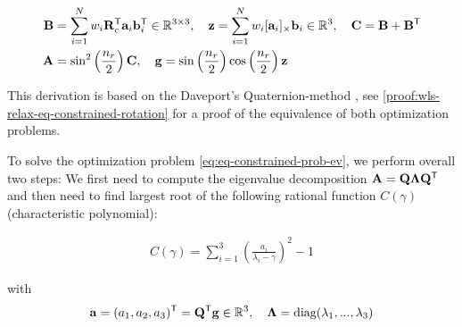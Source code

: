 \begin{equation}
	\label{eq:davenport-data-matrices}
	\begin{aligned}
		\mathbf{B} &= \sum_{i=1}^N w_i \mathbf{R}_c^{\mathsf{T}} \mathbf{a}_i\mathbf{b}_i^{\mathsf{T}} \in \mathbb{R}^{3 \times 3}, \quad
		\mathbf{z} = \sum_{i=1}^N w_i [\mathbf{a}_i]_{\times}\mathbf{b}_i \in \mathbb{R}^{3}, \quad \mathbf{C} = \mathbf{B} + \mathbf{B}^{\mathsf{T}}\\
		\mathbf{A} &= \sin^2 \left(\frac{n_r}{2} \right) \mathbf{C}, \quad \mathbf{g} =  \sin \left(\frac{n_r}{2} \right) \cos \left(\frac{n_r}{2} \right) \mathbf{z}
	\end{aligned}
\end{equation}

This derivation is based on the Daveport's Quaternion-method \cite{davenportsQ} \cite{8594296}, see \ref{proof:wls-relax-eq-constrained-rotation} for a proof of the equivalence of both optimization problems.

To solve the optimization problem \ref{eq:eq-constrained-prob-ev}, we perform overall two steps: We first need to compute the eigenvalue decomposition  $\mathbf{A} = \mathbf{Q}\mathbf{\Lambda}\mathbf{Q}^{\mathsf{T}}$ and then need to find largest root of the following rational function $C(\gamma)$ (characteristic polynomial): 

\begin{equation}
	\label{eq:characterisitc-poly}
	\begin{aligned}
		C(\gamma) = \sum_{i=1}^3 \left(\frac{a_i}{\lambda_i - \gamma}\right)^2 - 1
	\end{aligned}
\end{equation}

with
\begin{equation}
	\begin{aligned}
		\mathbf{a} = (a_1, a_2, a_3)^{\mathsf{T}} = \mathbf{Q}^{\mathsf{T}} \mathbf{g} \in \mathbb{R}^3, \quad \mathbf{\Lambda} = \text{diag}(\lambda_1, ..., \lambda_3)
	\end{aligned}
\end{equation}

